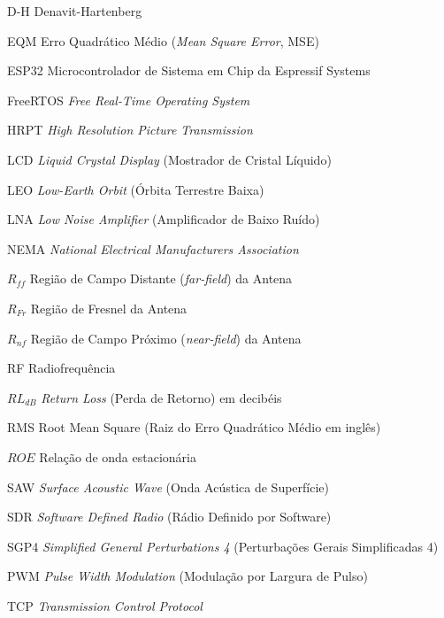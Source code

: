 \documentclass[
	12pt,					%
	openright,				%
	oneside,					%
	a4paper,					%
	english,					%
	brazilian				%
	]{abntex2}
\begin{document}
\begin{siglas}
  \item[D-H] Denavit-Hartenberg
  \item[EQM] Erro Quadrático Médio (\textit{Mean Square Error}, MSE)
  \item[ESP32] Microcontrolador de Sistema em Chip da Espressif Systems
  \item[FreeRTOS] \textit{Free Real-Time Operating System}
  \item[HRPT] \textit{High Resolution Picture Transmission}
  \item[LCD] \textit{Liquid Crystal Display} (Mostrador de Cristal Líquido)
  \item[LEO] \textit{Low-Earth Orbit} (Órbita Terrestre Baixa)
  \item[LNA] \textit{Low Noise Amplifier} (Amplificador de Baixo Ruído)
  \item[NEMA] \textit{National Electrical Manufacturers Association}
  \item[$R_{ff}$] Região de Campo Distante (\textit{far-field}) da Antena
  \item[$R_{Fr}$] Região de Fresnel da Antena
  \item[$R_{nf}$] Região de Campo Próximo (\textit{near-field}) da Antena
  \item[RF] Radiofrequência
  \item[$RL_{dB}$] \textit{Return Loss} (Perda de Retorno) em decibéis 
  \item[RMS] Root Mean Square (Raiz do Erro Quadrático Médio em inglês)
  \item[$ROE$] Relação de onda estacionária
  \item[SAW] \textit{Surface Acoustic Wave} (Onda Acústica de Superfície)
  \item[SDR] \textit{Software Defined Radio} (Rádio Definido por Software)
  \item[SGP4] \textit{Simplified General Perturbations 4} (Perturbações Gerais Simplificadas 4)
  \item[PWM] \textit{Pulse Width Modulation} (Modulação por Largura de Pulso)
  \item[TCP] \textit{Transmission Control Protocol}
\end{siglas}
\end{document}
